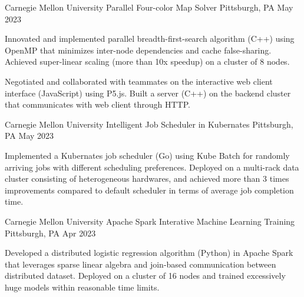 

\begin{cventries}

  \cventry
    {Carnegie Mellon University} %
    {Parallel Four-color Map Solver} %
    {Pittsburgh, PA} %
    {May 2023} %
    {
      \begin{cvitems} %
        \item {Innovated and implemented parallel breadth-first-search algorithm (C++) using OpenMP that minimizes 
        inter-node dependencies and cache false-sharing. Achieved super-linear scaling (more than 10x speedup) on 
        a cluster of 8 nodes.}
        \item {Negotiated and collaborated with teammates on the interactive web client interface (JavaScript) 
        using P5.js. Built a server (C++) on the backend cluster that communicates with web client through HTTP.}
      \end{cvitems}
    }

  \cventry
    {Carnegie Mellon University} %
    {Intelligent Job Scheduler in Kubernates} %
    {Pittsburgh, PA} %
    {May 2023} %
    {
      \begin{cvitems} %
        \item {Implemented a Kubernates job scheduler (Go) using Kube Batch for randomly arriving jobs with 
        different scheduling preferences. Deployed on a multi-rack data cluster consisting of heterogeneous 
        hardwares, and achieved more than 3 times improvements compared to default scheduler in terms of average
        job completion time.}
      \end{cvitems}
    }

  \cventry
    {Carnegie Mellon University} %
    {Apache Spark Interative Machine Learning Training} %
    {Pittsburgh, PA} %
    {Apr 2023} %
    {
      \begin{cvitems} %
        \item {Developed a distributed logistic regression algorithm (Python) in Apache Spark that leverages 
        sparse linear algebra and join-based communication between distributed dataset. Deployed on a cluster 
        of 16 nodes and trained excessively huge models within reasonable time limits.}
      \end{cvitems}
    }


\end{cventries}
